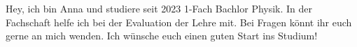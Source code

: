 \begin{multicols}{2}
{
Hey, ich bin Anna und studiere seit 2023 1-Fach Bachlor Physik. In der Fachschaft helfe ich bei der Evaluation der Lehre mit. Bei Fragen könnt ihr euch gerne an mich wenden.
Ich wünsche euch einen guten Start ins Studium!
}


\end{multicols}
